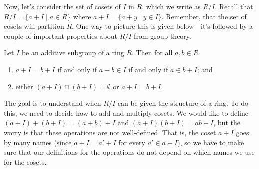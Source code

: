 Now, let's consider the set of cosets of $I$ in $R$, which we write as $R/I$. Recall that $R/I = \{a + I\mid a\in R\}$ where $a+I = \{a+y\mid y\in I\}$. Remember, that the set of cosets will partition $R$. One way to picture this is given below---it's followed by a couple of important properties about $R/I$ from group theory.

\begin{center}
\end{center}


\begin{fact}\label{fact.AdditiveSubgroupRingQuotientProperties}
Let $I$ be an additive subgroup of a ring $R$. Then for all $a,b\in R$
\begin{enumerate}
\item $a + I = b+I$ if and only if $a-b\in I$ if and only if $a \in b + I$; and
\item either $(a + I )\cap (b+I )= \emptyset$ or $a + I = b + I$.
\end{enumerate}
\end{fact}

The goal is to understand when $R/I$ can be given the structure of a ring. To do this, we need to decide how to add and multiply cosets. We would like to define $(a + I) + (b + I) = (a+b) + I$ and $(a + I)(b + I) = ab + I$, but the worry is that these operations are not well-defined. That is, the coset $a + I$ goes by many names (since $a+I = a'+I$ for every $a' \in a+I$), so we have to make sure that our definitions for the operations do not depend on which names we use for the cosets. 

